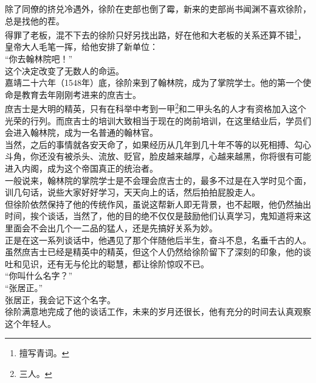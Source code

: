 \begin{multicols}{\theparacolNo}
除了同僚的挤兑冷遇外，徐阶在吏部也倒了霉，新来的吏部尚书闻渊不喜欢徐阶，总是找他的茬。\\

得罪了老板，混不下去的徐阶只好另找出路，好在他和大老板的关系还算不错\footnote{擅写青词。}，皇帝大人毛笔一挥，给他安排了新单位：\\

“你去翰林院吧！”\\

这个决定改变了无数人的命运。\\

嘉靖二十六年（1548年）底，徐阶来到了翰林院，成为了掌院学士。他的第一个使命是教育去年刚刚考进来的庶吉士。\\

庶吉士是大明的精英，只有在科举中考到一甲\footnote{三人。}和二甲头名的人才有资格加入这个光荣的行列。而庶吉士的培训大致相当于现在的岗前培训，在这里结业后，学员们会进入翰林院，成为一名普通的翰林官。\\

当然，之后的事情就各安天命了，如果经历从几年到几十年不等的以死相搏、勾心斗角，你还没有被杀头、流放、贬官，脸皮越来越厚，心越来越黑，你将很有可能进入内阁，成为这个帝国真正的统治者。\\

一般说来，翰林院的掌院学士是不会理会庶吉士的，最多不过是在入学时见个面，训几句话，说些大家好好学习，天天向上的话，然后拍拍屁股走人。\\

但徐阶依然保持了他的传统作风，虽说这帮新人即无背景，也不起眼，他仍然抽出时间，挨个谈话，当然了，他的目的绝不仅仅是鼓励他们认真学习，鬼知道将来这里面会不会出几个一二品的猛人，还是先搞好关系为妙。\\

正是在这一系列谈话中，他遇见了那个伴随他后半生，奋斗不息，名垂千古的人。\\

虽然庶吉士已经是精英中的精英，但这个人仍然给徐阶留下了深刻的印象，他的谈吐和见识，还有无与伦比的聪慧，都让徐阶惊叹不已。\\

“你叫什么名字？”\\

“张居正。”\\

张居正，我会记下这个名字。\\

徐阶满意地完成了他的谈话工作，未来的岁月还很长，他有充分的时间去认真观察这个年轻人。\\


\end{multicols}
